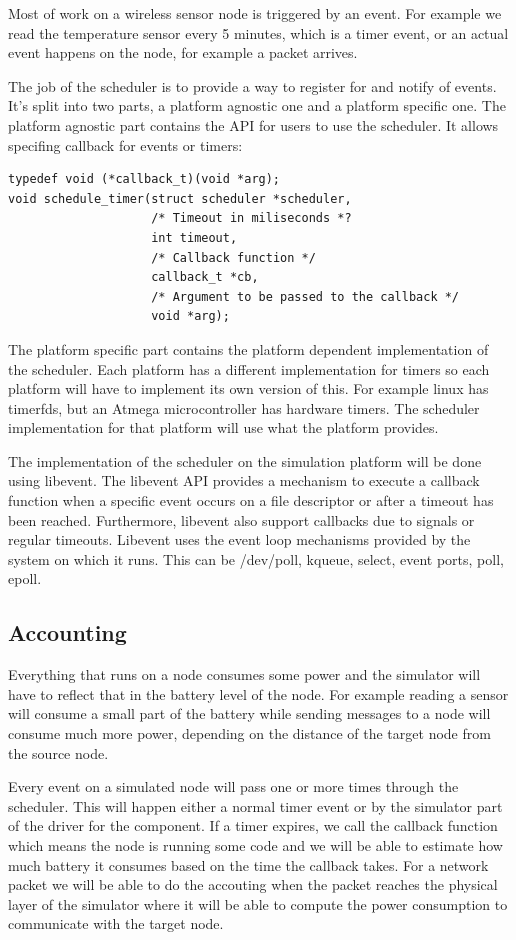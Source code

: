 Most of work on a wireless sensor node is triggered by an event. For example
we read the temperature sensor every 5 minutes, which is a timer event, or an
actual event happens on the node, for example a packet arrives.

The job of the scheduler is to provide a way to register for and notify of
events. It's split into two parts, a platform agnostic one and a platform
specific one. The platform agnostic part contains the API for users to use the
scheduler. It allows specifing callback for events or timers:

\begin{lstlisting}
typedef void (*callback_t)(void *arg);
void schedule_timer(struct scheduler *scheduler,
                    /* Timeout in miliseconds *?
                    int timeout, 
                    /* Callback function */
                    callback_t *cb, 
                    /* Argument to be passed to the callback */
                    void *arg);
\end{lstlisting}
The platform specific part contains the platform dependent implementation of
the scheduler. Each platform has a different implementation for timers so each
platform will have to implement its own version of this. For example linux has
timerfds, but an Atmega microcontroller has hardware timers. The scheduler
implementation for that platform will use what the platform provides.

The implementation of the scheduler on the simulation platform will be done
using libevent\cite{libevent}. The libevent API provides a mechanism to execute a callback
function when a specific event occurs on a file descriptor or after a timeout
has been reached. Furthermore, libevent also support callbacks due to signals
or regular timeouts. Libevent uses the event loop mechanisms provided by the
system on which it runs. This can be /dev/poll, kqueue, select, event ports,
poll, epoll.

\subsection{Accounting}

Everything that runs on a node consumes some power and the simulator will have
to reflect that in the battery level of the node. For example reading a sensor
will consume a small part of the battery while sending messages to a node will
consume much more power, depending on the distance of the target node from the
source node.

Every event on a simulated node will pass one or more times through the
scheduler. This will happen either a normal timer event or by the simulator
part of the driver for the component. If a timer expires, we call the callback
function which means the node is running some code and we will be able to
estimate how much battery it consumes based on the time the callback takes.
For a network packet we will be able to do the accouting when the packet
reaches the physical layer of the simulator where it will be able to compute
the power consumption to communicate with the target node.
